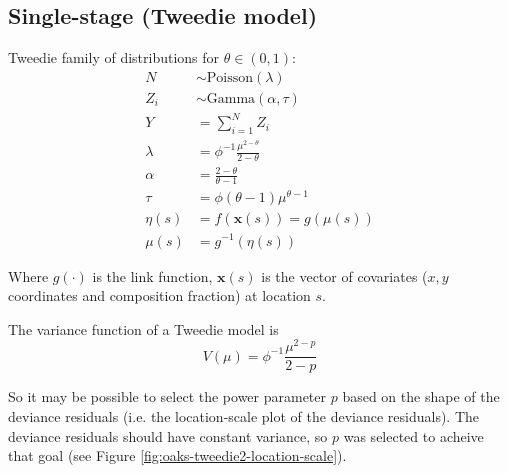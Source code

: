 \documentclass[authoryear, review, 11pt]{elsarticle}
\begin{document}
\subsection{Single-stage (Tweedie model)}
Tweedie family of distributions for $\theta \in (0,1)$:\\
\begin{equation*}
  \begin{split}
    N &\sim \text{Poisson}(\lambda)    \\
    Z_i &\sim \text{Gamma}(\alpha, \tau)    \\
    Y &= \sum\limits_{i=1}^N Z_i \\
    \lambda &= \phi^{-1} \frac{\mu^{2-\theta}}{2-\theta} \\
    \alpha &= \frac{2-\theta}{\theta-1} \\
    \tau &= \phi (\theta - 1) \mu^{\theta - 1}    \\
    \eta(s) &= f\left(\bm{x}(s)\right) = g\left(\mu(s)\right)\\
    \mu(s) &= g^{-1}\left(\eta(s)\right)
  \end{split}
\end{equation*}

Where $g(\cdot)$ is the link function, $\bm{x}(s)$ is the vector of covariates ($x, y$ coordinates and composition fraction) at location $s$.

The variance function of a Tweedie model is
\[
  V(\mu)  = \phi^{-1} \frac{\mu^{2-p}}{2-p}
\]

So it may be possible to select the power parameter $p$ based on the shape of the deviance residuals (i.e. the location-scale plot of the deviance residuals). The deviance residuals should have constant variance, so $p$ was selected to acheive that goal (see Figure \ref{fig:oaks-tweedie2-location-scale}).
\end{document}
